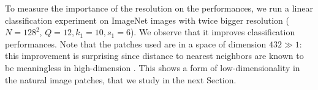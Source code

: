 \documentclass{article} %
\begin{document}
To measure the importance of the resolution on the performances, we run a linear classification experiment on ImageNet images with twice bigger resolution ($N=128^2$, $Q=12, k_1=10,s_1=6$).
We observe that it improves classification performances.
Note that the patches used are in a space of dimension $432 \gg 1$: this improvement is surprising since distance to nearest neighbors are known to be meaningless in high-dimension \citep{beyer1999nearest}.
This shows a form of low-dimensionality in the natural image patches, that we study in the next Section.

\end{document}

